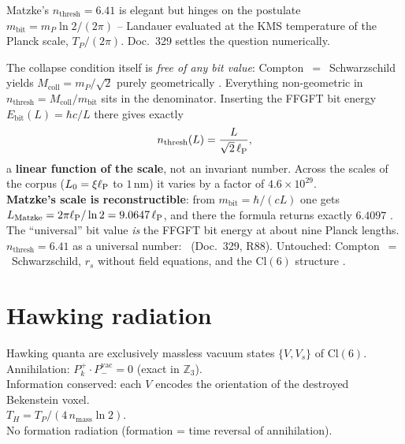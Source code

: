 \begin{tcolorbox}[divbox, title={Settled: the threshold is scale-dependent \B\ (Doc.~329)}]
  Matzke's $n_{\mathrm{thresh}} = 6.41$ is elegant but hinges on the
  postulate $m_{\mathrm{bit}} = m_P\ln 2/(2\pi)$ -- Landauer evaluated at
  the KMS temperature of the Planck scale, $T_P/(2\pi)$.
  Doc.~329 settles the question numerically.

  The collapse condition itself is \emph{free of any bit value}:
  Compton~$=$~Schwarzschild yields $M_{\mathrm{coll}} = m_P/\sqrt{2}$
  purely geometrically \B. Everything non-geometric in
  $n_{\mathrm{thresh}} = M_{\mathrm{coll}}/m_{\mathrm{bit}}$ sits in the
  denominator. Inserting the FFGFT bit energy
  $E_{\mathrm{bit}}(L) = \hbar c/L$ there gives exactly
  \begin{equation}
    n_{\mathrm{thresh}}(L) = \frac{L}{\sqrt{2}\,\ell_{\mathrm{P}}},
  \end{equation}
  a \textbf{linear function of the scale}, not an invariant number.
  Across the scales of the corpus ($L_0 = \xi\ell_{\mathrm{P}}$ to $1$\,nm) it varies by
  a factor of $4.6\times10^{29}$.\\[4pt]
  \textbf{Matzke's scale is reconstructible}: from
  $m_{\mathrm{bit}} = \hbar/(cL)$ one gets
  $L_{\mathrm{Matzke}} = 2\pi\ell_{\mathrm{P}}/\ln 2 = 9.0647\,\ell_{\mathrm{P}}$, and there the formula
  returns exactly $6.4097$ \B. The \enquote{universal} bit value \emph{is}
  the FFGFT bit energy at about nine Planck lengths.\\[4pt]
  $n_{\mathrm{thresh}} = 6.41$ as a universal number: \X\ (Doc.~329, R88).
  Untouched: Compton~$=$~Schwarzschild, $r_s$ without field equations,
  and the $\mathrm{Cl}(6)$ structure \B.
\end{tcolorbox}

\section{Hawking radiation}

\begin{tcolorbox}[matzbox, title={Matzke}]
  Hawking quanta are exclusively massless vacuum states $\{V, V_s\}$ of
  $\mathrm{Cl}(6)$. Annihilation: $P_k^+ \cdot P_-^{\mathrm{vac}} = 0$
  (exact in $\mathbb{Z}_3$). \B\\
  Information conserved: each $V$ encodes the orientation of the
  destroyed Bekenstein voxel.\\
  $T_H = T_P/(4\,n_{\mathrm{mass}}\ln 2)$. \B\\
  No formation radiation (formation = time reversal of annihilation).
\end{tcolorbox}

